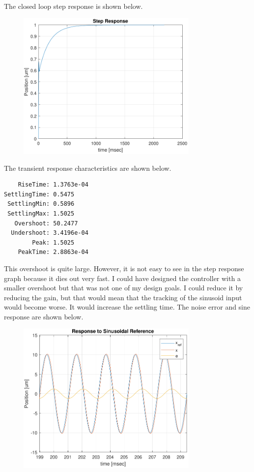 \documentclass[12pt]{article}
\begin{document}
The closed loop step response is shown below.
\begin{figure}[H]
    \begin{center}
        \includegraphics[width=3.5in]{PositionControl-Step.pdf}
    \end{center}
\end{figure}
The transient response characteristics are shown below.
\begin{verbatim}
    RiseTime: 1.3763e-04
SettlingTime: 0.5475
 SettlingMin: 0.5896
 SettlingMax: 1.5025
   Overshoot: 50.2477
  Undershoot: 3.4196e-04
        Peak: 1.5025
    PeakTime: 2.8863e-04
\end{verbatim}
This overshoot is quite large. However, it is not easy to see in the step response graph because it dies out
very fast. I could have designed the controller with a smaller overshoot but that was not one of my design goals. I could
reduce it by reducing the gain, but that would mean that the tracking of the sinusoid input would become worse. It
would increase the settling time. The noise error and sine response are shown below.
\begin{figure}[H]
    \begin{center}
        \includegraphics[width=3.5in]{PositionControl-Sine.pdf}
    \end{center}
\end{figure}
\end{document}
